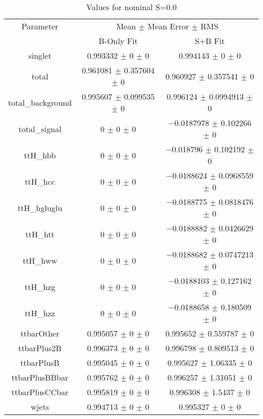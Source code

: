 \begin{table}
\centering
\caption{Values for nominal S=0.0}
\begin{tabular}{ccc}
\toprule
Parameter & \multicolumn{2}{c}{Mean $\pm$ Mean Error $\pm$ RMS}\\
 & B-Only Fit & S+B Fit\\
\midrule
singlet & \num{0.993332} $\pm$ \num{0} $\pm$ \num{0} & \num{0.994143} $\pm$ \num{0} $\pm$ \num{0}\\
total & \num{0.961081} $\pm$ \num{0.357604} $\pm$ \num{0} & \num{0.960927} $\pm$ \num{0.357541} $\pm$ \num{0}\\
total\_background & \num{0.995607} $\pm$ \num{0.099535} $\pm$ \num{0} & \num{0.996124} $\pm$ \num{0.0994913} $\pm$ \num{0}\\
total\_signal & \num{0} $\pm$ \num{0} $\pm$ \num{0} & \num{-0.0187978} $\pm$ \num{0.102266} $\pm$ \num{0}\\
ttH\_hbb & \num{0} $\pm$ \num{0} $\pm$ \num{0} & \num{-0.018796} $\pm$ \num{0.102192} $\pm$ \num{0}\\
ttH\_hcc & \num{0} $\pm$ \num{0} $\pm$ \num{0} & \num{-0.0188624} $\pm$ \num{0.0968559} $\pm$ \num{0}\\
ttH\_hgluglu & \num{0} $\pm$ \num{0} $\pm$ \num{0} & \num{-0.0188775} $\pm$ \num{0.0818476} $\pm$ \num{0}\\
ttH\_htt & \num{0} $\pm$ \num{0} $\pm$ \num{0} & \num{-0.0188882} $\pm$ \num{0.0426629} $\pm$ \num{0}\\
ttH\_hww & \num{0} $\pm$ \num{0} $\pm$ \num{0} & \num{-0.0188682} $\pm$ \num{0.0747213} $\pm$ \num{0}\\
ttH\_hzg & \num{0} $\pm$ \num{0} $\pm$ \num{0} & \num{-0.0188103} $\pm$ \num{0.127162} $\pm$ \num{0}\\
ttH\_hzz & \num{0} $\pm$ \num{0} $\pm$ \num{0} & \num{-0.0188658} $\pm$ \num{0.180509} $\pm$ \num{0}\\
ttbarOther & \num{0.995057} $\pm$ \num{0} $\pm$ \num{0} & \num{0.995652} $\pm$ \num{0.559787} $\pm$ \num{0}\\
ttbarPlus2B & \num{0.996373} $\pm$ \num{0} $\pm$ \num{0} & \num{0.996798} $\pm$ \num{0.809513} $\pm$ \num{0}\\
ttbarPlusB & \num{0.995045} $\pm$ \num{0} $\pm$ \num{0} & \num{0.995627} $\pm$ \num{1.06335} $\pm$ \num{0}\\
ttbarPlusBBbar & \num{0.995762} $\pm$ \num{0} $\pm$ \num{0} & \num{0.996257} $\pm$ \num{1.31051} $\pm$ \num{0}\\
ttbarPlusCCbar & \num{0.995819} $\pm$ \num{0} $\pm$ \num{0} & \num{0.996308} $\pm$ \num{1.5437} $\pm$ \num{0}\\
wjets & \num{0.994713} $\pm$ \num{0} $\pm$ \num{0} & \num{0.995327} $\pm$ \num{0} $\pm$ \num{0}\\
\bottomrule
\end{tabular}
\end{table}